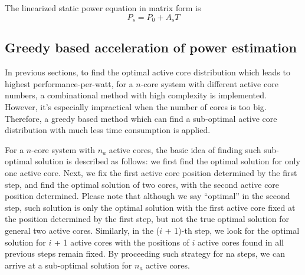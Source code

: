 The linearized static power equation in matrix form is
\begin{equation}\label{linear_static_matrix}
P_{s} = P_{0}+A_{s}T
\end{equation}


\subsection{Greedy based acceleration of power estimation}
In previous sections, to find the optimal active core distribution which leads to highest performance-per-watt, for a $n$-core system with different active core numbers,  a combinational method with high complexity is implemented. However, it's  especially impractical when the number of cores is too big. Therefore, a greedy based method which can find a sub-optimal active core distribution with much less time consumption is applied.

For a $n$-core system with $n_{a}$ active cores, the basic idea of finding such sub-optimal solution is described as follows: we first find the optimal solution for only one active core. Next, we fix the first active core position determined by the first step, and find the optimal solution of two cores, with the second active core position determined. Please note that although we say “optimal” in the second step, such solution is only the optimal solution with the first active core fixed at the position determined by the first step, but not the true optimal solution for general two active cores. Similarly, in the ($i$ + 1)-th step, we look for the optimal solution for $i$ + 1 active cores with the positions of $i$ active cores found in all previous steps remain fixed. By proceeding such strategy for na steps, we can arrive at a sub-optimal solution for $n_{a}$ active cores.




